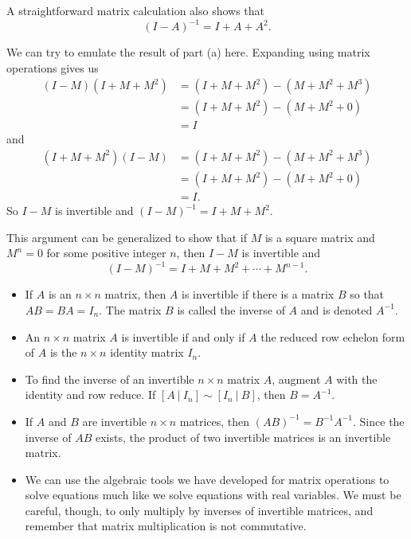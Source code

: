 \begin{example}
\begin{enumerate}[i.]
A straightforward matrix calculation also shows that 
\[(I-A)^{-1} = I+A+A^2.\]
	
	\end{enumerate}

\item We can try to emulate the result of part (a) here. Expanding using matrix operations gives us
\begin{align*}
(I-M)(I+M+M^2) &= (I+M+M^2) - (M+M^2+M^3) \\
	&= (I+M+M^2) - (M+M^2+0) \\
	&= I
\end{align*}
and
\begin{align*}
(I+M+M^2)(I-M) &= (I+M+M^2) - (M+M^2+M^3) \\
	&= (I+M+M^2) - (M+M^2+0) \\
	&= I.
\end{align*}	 
So $I-M$ is invertible and $(I-M)^{-1} = I+M+M^2$. 

This argument can be generalized to show that if $M$ is a square matrix and $M^n = 0$ for some positive integer $n$, then $I-M$ is invertible and 
\[(I-M)^{-1} = I+M+M^2+ \cdots + M^{n-1}.\] 

\ea


\end{example}

\label{sec:inverse_summ}
\begin{itemize}
\item If $A$ is an $n \times n$ matrix, then $A$ is invertible if there is a matrix $B$ so that $AB = BA = I_n$. The matrix $B$ is called the inverse of $A$ and is denoted $A^{-1}$.
\item An $n \times n$ matrix $A$ is invertible if and only if $A$ the reduced row echelon form of $A$ is the $n \times n$ identity matrix $I_n$. 
\item To find the inverse of an invertible $n \times n$ matrix $A$, augment $A$ with the identity and row reduce. If $[A \ | \ I_n] \sim [I_n \ | \ B]$, then $B = A^{-1}$.
\item If $A$ and $B$ are invertible $n \times n$ matrices, then $(AB)^{-1}=B^{-1}A^{-1}$. Since the inverse of $AB$ exists, the product of two invertible matrices is an invertible matrix. 
\item We can use the algebraic tools we have developed for matrix operations to solve equations much like we solve equations with real variables. We must be careful, though, to only multiply by inverses of invertible matrices, and remember that matrix multiplication is not commutative. 
\end{itemize}




